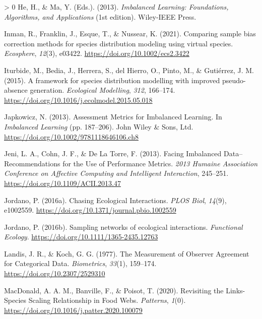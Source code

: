 \documentclass[11pt]{article}
\newlength{\cslhangindent}
\newenvironment{CSLReferences}[3] %
 {%
  \setlength{\parindent}{0pt}
  \ifodd #1 \everypar{\setlength{\hangindent}{\cslhangindent}}\ignorespaces\fi
  \ifnum #2 > 0
  \setlength{\parskip}{#2\baselineskip}
  \fi
 }%
 {}
\begin{document}
\begin{CSLReferences}{1}{0}
\leavevmode\hypertarget{ref-He2013ImbLea}{}%
He, H., \& Ma, Y. (Eds.). (2013). \emph{Imbalanced Learning:
Foundations, Algorithms, and Applications} (1st edition). Wiley-IEEE
Press.

\leavevmode\hypertarget{ref-Inman2021ComSam}{}%
Inman, R., Franklin, J., Esque, T., \& Nussear, K. (2021). Comparing
sample bias correction methods for species distribution modeling using
virtual species. \emph{Ecosphere}, \emph{12}(3), e03422.
\url{https://doi.org/10.1002/ecs2.3422}

\leavevmode\hypertarget{ref-Iturbide2015FraSpe}{}%
Iturbide, M., Bedia, J., Herrera, S., del Hierro, O., Pinto, M., \&
Gutiérrez, J. M. (2015). A framework for species distribution modelling
with improved pseudo-absence generation. \emph{Ecological Modelling},
\emph{312}, 166--174.
\url{https://doi.org/10.1016/j.ecolmodel.2015.05.018}

\leavevmode\hypertarget{ref-Japkowicz2013AssMet}{}%
Japkowicz, N. (2013). Assessment Metrics for Imbalanced Learning. In
\emph{Imbalanced Learning} (pp. 187--206). John Wiley \& Sons, Ltd.
\url{https://doi.org/10.1002/9781118646106.ch8}

\leavevmode\hypertarget{ref-Jeni2013FacImb}{}%
Jeni, L. A., Cohn, J. F., \& De La Torre, F. (2013). Facing Imbalanced
Data--Recommendations for the Use of Performance Metrics. \emph{2013
Humaine Association Conference on Affective Computing and Intelligent
Interaction}, 245--251. \url{https://doi.org/10.1109/ACII.2013.47}

\leavevmode\hypertarget{ref-Jordano2016ChaEco}{}%
Jordano, P. (2016a). Chasing Ecological Interactions. \emph{PLOS Biol},
\emph{14}(9), e1002559.
\url{https://doi.org/10.1371/journal.pbio.1002559}

\leavevmode\hypertarget{ref-Jordano2016SamNet}{}%
Jordano, P. (2016b). Sampling networks of ecological interactions.
\emph{Functional Ecology}. \url{https://doi.org/10.1111/1365-2435.12763}

\leavevmode\hypertarget{ref-Landis1977MeaObs}{}%
Landis, J. R., \& Koch, G. G. (1977). The Measurement of Observer
Agreement for Categorical Data. \emph{Biometrics}, \emph{33}(1),
159--174. \url{https://doi.org/10.2307/2529310}

\leavevmode\hypertarget{ref-MacDonald2020RevLin}{}%
MacDonald, A. A. M., Banville, F., \& Poisot, T. (2020). Revisiting the
Links-Species Scaling Relationship in Food Webs. \emph{Patterns},
\emph{1}(0). \url{https://doi.org/10.1016/j.patter.2020.100079}


\end{CSLReferences}
\end{document}
